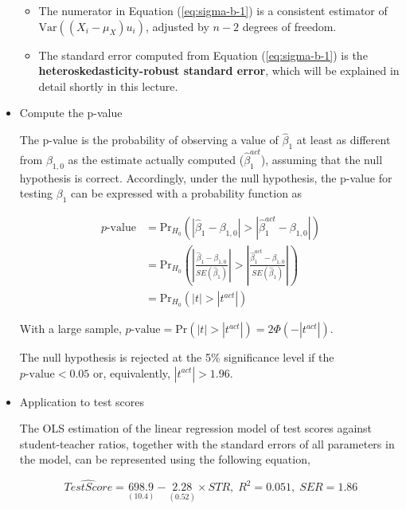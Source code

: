 \documentclass[a4paper,11pt]{article}
\newcommand{\var}{\mathrm{Var}}
\newcommand{\pr}{\mathrm{Pr}}
\begin{document}
\begin{itemize}
\begin{itemize}
\item The numerator in Equation (\ref{eq:sigma-b-1}) is a consistent
estimator of \(\var((X_i - \mu_X)u_i)\), adjusted by \(n-2\) degrees
of freedom.

\item The standard error computed from Equation (\ref{eq:sigma-b-1}) is
the \textbf{heteroskedasticity-robust standard error}, which will be
explained in detail shortly in this lecture.
\end{itemize}

\item Compute the p-value
\label{sec:org3068a96}

The p-value is the probability of observing a value of \(\hat{\beta}_1\)
at least as different from \(\beta_{1,0}\) as the estimate actually
computed (\(\hat{\beta}^{act}_1\)), assuming that the null hypothesis is
correct. Accordingly, under the null hypothesis, the p-value for
testing \(\beta_1\) can be expressed with a probability function as

\begin{equation*}
\begin{split}
p\text{-value} &= \pr_{H_0} \left( | \hat{\beta}_1 - \beta_{1,0} | > | \hat{\beta}^{act}_1 - \beta_{1,0} | \right) \\
&= \pr_{H_0} \left( \left| \frac{\hat{\beta}_1 - \beta_{1,0}}{SE(\hat{\beta}_1)} \right| > \left| \frac{\hat{\beta}^{act}_1 - \beta_{1,0}}{SE(\hat{\beta}_1)} \right| \right) \\
&= \pr_{H_0} \left( |t| > |t^{act}| \right)
\end{split}
\end{equation*}

With a large sample, \(p\text{-value} = \pr\left(|t| > |t^{act}|
\right) = 2 \varPhi(-|t^{act}|)\).

The null hypothesis is rejected at the 5\% significance level if the
\(p\text{-value} < 0.05\) or, equivalently, \(|t^{act}| > 1.96\). 

\item Application to test scores
\label{sec:orgb210dc3}

The OLS estimation of the linear regression model of test scores
against student-teacher ratios, together with the standard errors of
all parameters in the model, can be represented using the following
equation, 

\begin{equation*}
\widehat{TestScore} = \underset{\displaystyle (10.4)}{698.9} - \underset{\displaystyle (0.52)}{2.28} \times STR,\; R^2 = 0.051,\; SER = 1.86
\end{equation*}


\end{itemize}
\end{document}
